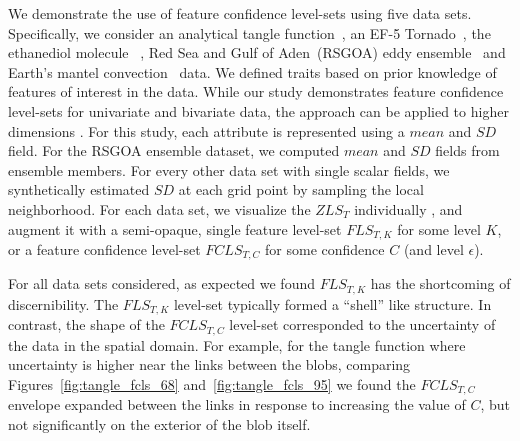 
We demonstrate the use of feature confidence level-sets using five data sets.
%
Specifically, we consider an analytical tangle function~\cite{knoll2009fast}, an EF-5 Tornado~\cite{atmos10100578}, the ethanediol molecule~\cite{} , Red Sea and Gulf of Aden~(RSGOA) eddy ensemble~\cite{sanikommu2020impact} and Earth's mantel convection~\cite{shahnas2017mid} data.
%
We defined traits based on prior knowledge of features of interest in the data.
%
While our study demonstrates feature confidence level-sets for univariate and bivariate data, the approach can be applied to higher dimensions .
%
For this study, each attribute is represented using a $mean$ and $SD$ field. 
%
For the RSGOA ensemble dataset, we computed $mean$ and $SD$ fields from ensemble members. 
%
For every other data set with single scalar fields, we synthetically estimated $SD$ at each grid point by sampling the local neighborhood.
%
For each data set, we visualize the $ZLS_{T}$ individually , and augment it with a semi-opaque, single feature level-set $FLS_{T,K}$ for some level $K$, or a feature confidence level-set $FCLS_{T,C}$ for some confidence $C$ (and level $\epsilon$).
%

For all data sets considered, as expected we found $FLS_{T,K}$ has the shortcoming of discernibility.
%
The $FLS_{T,K}$ level-set typically formed a ``shell'' like structure.
%
In contrast, the shape of the $FCLS_{T,C}$ level-set corresponded to the uncertainty of the data in the spatial domain.
%
For example, for the tangle function where uncertainty is higher near the links between the blobs, comparing Figures~\ref{fig:tangle_fcls_68} and~\ref{fig:tangle_fcls_95} we found the $FCLS_{T,C}$ envelope expanded between the links in response to increasing the value of $C$, but not significantly on the exterior of the blob itself.

